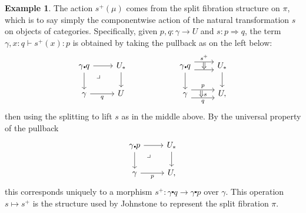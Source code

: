 \documentclass[10pt]{article}
\theoremstyle{definition}
\newtheorem{example}{Example}
\newcommand\TrPlus[2]{\ensuremath{{#1}^+(#2)}}
\newcommand\TrPlusSym[1]{\ensuremath{{#1}^+}}
\newcommand\ce{\mathord{\centerdot}}
\newcommand\Un{U}
\newcommand\Ub{U_*}
\begin{document}
\begin{example}
  The action $\TrPlus{s}{\mu}$ comes from the split fibration structure on $\pi$, which is to say simply the componentwise action of the natural transformation $s$ on objects of categories.
  Specifically, given $p,q:\gamma\to \Un$ and $s:p\Rightarrow q$, the term $\gamma, x:q \vdash \TrPlus{s}{x} : p$ is obtained by taking the pullback as on the left below:
  \[
    \begin{tikzcd}
      \gamma\ce q \ar[r] \ar[d] \ar[dr,phantom,near start,"\lrcorner"] & \Ub \ar[d] \\
      \gamma \ar[r,"q"'] & \Un
    \end{tikzcd}
    \hspace{2cm}
    \begin{tikzcd}
      \gamma\ce q \ar[r,"\TrPlusSym{s}",shift left=2] \ar[r,phantom,"\Downarrow"] \ar[r,shift right=2] \ar[d] & \Ub \ar[d] \\
      \gamma \ar[r,"p", shift left=2] \ar[r,phantom,"\Downarrow \scriptstyle s"] \ar[r,"q"',shift right=2] & \Un,
    \end{tikzcd}
  \]
  then using the splitting to lift $s$ as in the middle above.
  By the universal property of the pullback
  \[
    \begin{tikzcd}
      \gamma\ce p \ar[r] \ar[d] \ar[dr,phantom,near start,"\lrcorner"] & \Ub \ar[d] \\
      \gamma \ar[r,"p"'] & \Un,
    \end{tikzcd}
  \]
  this corresponds uniquely to a morphism $\TrPlusSym{s} : \gamma\ce q\to\gamma \ce p$ over $\gamma$.
  This operation $s\mapsto \TrPlusSym{s}$ is the structure used by Johnstone to represent the split fibration $\pi$.
\end{example}

\end{document}
